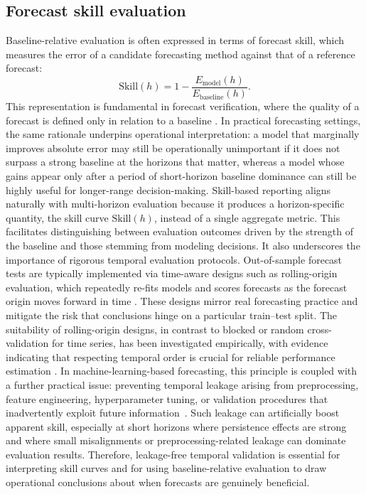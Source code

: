 \documentclass[pdflatex,sn-mathphys]{sn-jnl}
\begin{document}
\subsection{Forecast skill evaluation}
Baseline-relative evaluation is often expressed in terms of forecast
skill, which measures the error of a candidate forecasting method
against that of a reference forecast:
\begin{equation}
\mathrm{Skill}(h) = 1 - \frac{E_{\mathrm{model}}(h)}{E_{\mathrm{baseline}}(h)}.
\end{equation}
This representation is fundamental in forecast verification, where the
quality of a forecast is defined only in relation to a baseline
\citep{murphy1993}. In practical forecasting settings, the same rationale
underpins operational interpretation: a model that marginally improves
absolute error may still be operationally unimportant if it does not
surpass a strong baseline at the horizons that matter, whereas a model
whose gains appear only after a period of short-horizon baseline
dominance can still be highly useful for longer-range decision-making.
Skill-based reporting aligns naturally with multi-horizon evaluation
because it produces a horizon-specific quantity, the skill curve
$\mathrm{Skill}(h)$, instead of a single aggregate metric. This
facilitates distinguishing between evaluation outcomes driven by the
strength of the baseline and those stemming from modeling decisions. It
also underscores the importance of rigorous temporal evaluation
protocols. Out-of-sample forecast tests are typically implemented via
time-aware designs such as rolling-origin evaluation, which repeatedly
re-fits models and scores forecasts as the forecast origin moves forward
in time \citep{tashman2000}. These designs mirror real forecasting
practice and mitigate the risk that conclusions hinge on a particular
train--test split. The suitability of rolling-origin designs, in
contrast to blocked or random cross-validation for time series, has been
investigated empirically, with evidence indicating that respecting
temporal order is crucial for reliable performance estimation
\citep{cerqueira2020, bergmeir2012}.
In machine-learning-based forecasting, this principle is coupled with a
further practical issue: preventing temporal leakage arising from
preprocessing, feature engineering, hyperparameter tuning, or validation
procedures that inadvertently exploit future information~\citep{kapoor2023leakage}. Such leakage
can artificially boost apparent skill, especially at short horizons where
persistence effects are strong and where small misalignments or
preprocessing-related leakage can dominate evaluation results. Therefore,
leakage-free temporal validation is essential for interpreting skill
curves and for using baseline-relative evaluation to draw operational
conclusions about when forecasts are genuinely beneficial.
\end{document}
